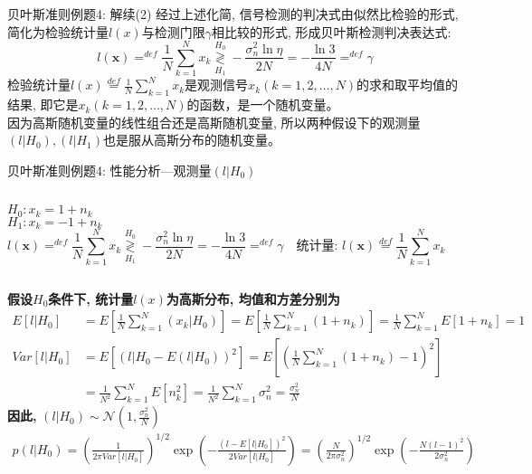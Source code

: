 \begin{frame}[shrink]{贝叶斯准则例题4: 解续(2)}
经过上述化简, 信号检测的判决式由似然比检验的形式, 简化为检验统计量$l(x)$与检测门限$\gamma$相比较的形式, 形成贝叶斯检测判决表达式:
\[
l(\bm{x})\mathop{=}^{def}\frac{1}{N}\sum\limits_{k=1}^{N}x_k\mathop{\gtrless}\limits_{H_1}^{H_0}-\frac{\sigma_n^2\ln\eta}{2N}=-\frac{\ln3}{4N}\mathop{=}^{def}\gamma
\]
检验统计量$l(x)\mathop{=}\limits^{def}\frac{1}{N}\sum\limits_{k=1}^Nx_k$是观测信号$x_k(k=1,2,\dots,N)$的求和取平均值的结果, 即它是$x_k(k=1,2,\dots,N)$的函数，是一个随机变量。\\
因为高斯随机变量的线性组合还是高斯随机变量,  所以两种假设下的观测量$(l|H_0),(l|H_1)$也是服从高斯分布的随机变量。
\end{frame}

\begin{frame}[shrink]{贝叶斯准则例题4: 性能分析---观测量$(l|H_0)$}
\begin{columns}
	$H_0:x_k=1+n_k$\\
	$H_1:x_k=-1+n_k$
	\[
	l(\bm{x})\mathop{=}^{def}\frac{1}{N}\sum\limits_{k=1}^{N}x_k\mathop{\gtrless}\limits_{H_1}^{H_0}-\frac{\sigma_n^2\ln\eta}{2N}=-\frac{\ln3}{4N}\mathop{=}^{def}\gamma \quad \textbf{统计量: }l(\bm{x})\mathop{=}\limits^{def}\frac{1}{N}\sum\limits_{k=1}^{N}x_k
	\]
\end{columns}
\textbf{假设$H_0$条件下, 统计量$l(x)$为高斯分布, 均值和方差分别为}
\begin{align*}
E[l|H_0]&=E\left[\frac{1}{N}\sum\limits_{k=1}^{N}(x_k|H_0)\right]=E\left[\frac{1}{N}\sum\limits_{k=1}^{N}(1+n_k)\right]=\frac{1}{N}\sum\limits_{k=1}^{N}E[1+n_k]=1\\
Var[l|H_0]&=E\left[(l|H_0-E(l|H_0))^2\right]=E\left[\left(\frac{1}{N}\sum\limits_{k=1}^{N}(1+n_k)-1\right)^2\right]\\
&=\frac{1}{N^2}\sum\limits_{k=1}^{N}E[n_k^2]=\frac{1}{N^2}\sum\limits_{k=1}^{N}\sigma_n^2=\frac{\sigma_n^2}{N}
\end{align*}
\textbf{因此, }$(l|H_0)\sim\mathcal{N}(1,\frac{\sigma_n^2}{N})$
\begin{align*}
p(l|H_0)=\left(\frac{1}{2\pi Var[l|H_0]}\right)^{1/2}\exp\left(-\frac{(l-E[l|H_0])^2}{2 Var[l|H_0]}\right)=\left(\frac{N}{2\pi\sigma_n^2}\right)^{1/2}\exp\left(-\frac{N(l-1)^2}{2\sigma_n^2}\right)
\end{align*}
\end{frame}

